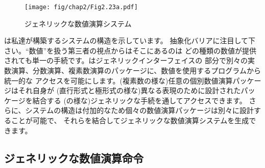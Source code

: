 \begin{figure}[tb]
\label{Figure 2.23}
\centering
\begin{comment}
\label{Figure 2.23}
\heading{Figure 2.23:} Generic arithmetic system.

\begin{example}
                        Programs that use numbers
                           +-----------------+
---------------------------| add sub mul div |-------------------
                           +-----------------+
                        Generic arithmetic package
 +-----------------+   +-------------------------+
 | add-rat sub-rat |   | add-complex sub-complex |   +---------+
-|                 |-+-|                         |-+-| + - * / |-
 | mul-rat div-rat | | | mul-complex div-complex | | +---------+
 +-----------------+ | +-------------------------+ |
      Rational       |     Complex artithmetic     |   Ordinary
     arithmetic      +--------------+--------------+  arithmetic
                     | Rectangular  |     Polar    |
---------------------+--------------+--------------+-------------
             List structure and primitive machine arithmetic
\end{example}
\end{comment}
\texttt{[image: fig/chap2/Fig2.23a.pdf]}
\par\bigskip
\noindent
{} ジェネリックな数値演算システム
\end{figure}

\noindent
{}は私達が構築するシステムの構造を示しています。
抽象化バリアに注目して下さい。``数値''を扱う第三者の視点からはそこにあるのは
どの種類の数値が提供されても単一の手続です。はジェネリックインターフェイスの
部分で別々の実数演算、分数演算、複素数演算のパッケージに、数値を使用するプログラムから統一的な
アクセスを可能にします。(複素数の様な)任意の個別数値演算パッケージはそれ自身が
(直行形式と極形式の様な)異なる表現のために設計されたパッケージを結合する
(の様な)ジェネリックな手続を通してアクセスできます。
さらに、システムの構造は付加的なため個々の数値演算パッケージは別々に設計することが可能で、
それらを結合してジェネリックな数値演算システムを生成できます。



\subsection{ジェネリックな数値演算命令}
\label{Section 2.5.1}


